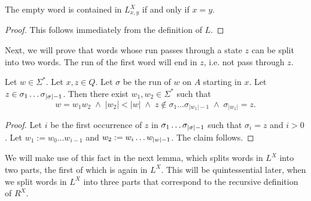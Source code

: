 
\begin{lemma}
    \label{L_nil}
    The empty word is contained in $L^X_{x,y}$ if and only if $x=y$.
\end{lemma}
\begin{proof}
   This follows immediately from the definition of $L$. 
\end{proof}


Next, we will prove that words whose run passes through a state $z$ can be split into two words. 
The run of the first word will end in $z$, i.e. not pass through $z$.

\begin{lemma}
    \label{run_split}
    Let $w \in \Sigma^*$. Let $x,z \in Q$. 
    Let $\sigma$ be the run of $w$ on $A$ starting in $x$.
    Let $z \in \sigma_1 \ldots {\sigma}_{|{\sigma}|-1}$.
    Then there exist $w_1, w_2 \in \Sigma^*$ such that
    \begin{equation*}
        w = w_1 w_2 \; \wedge \; |w_2| < |w| \; \wedge \; z \notin \sigma_1 \ldots \sigma_{|w_1|-1} \; \wedge \; \sigma_{|w_1|} = z.
    \end{equation*}
\end{lemma}
\begin{proof}
    Let $i$ be the first occurrence of $z$ in $\sigma_1 \dots {\sigma}_{|{\sigma}|-1}$ such that
    $\sigma_i = z$ and $i > 0$.
    Let $w_1 := w_0 \ldots w_{i-1}$ and $w_2 := w_i \ldots {w}_{|{w}|-1}$.
    The claim follows.
\end{proof}


We will make use of this fact in the next lemma, which splits words in $L^{X}$ into two parts,
the first of which is again in $L^{X}$. 
This will be quintessential later, when we split words in $L^{X}$ into three parts 
that correspond to the recursive definition of $R^X$.

